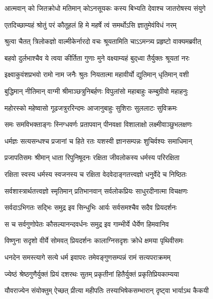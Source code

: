 \twolineshloka
{आत्मवान् को जितक्रोधो मतिमान् कोऽनसूयकः}
{कस्य बिभ्यति देवाश्च जातरोषस्य संयुगे}%

\twolineshloka
{एतदिच्छाम्यहं श्रोतुं परं कौतूहलं हि मे}
{महर्षे त्वं समर्थोऽसि ज्ञातुमेवंविधं नरम्}%

\twolineshloka
{श्रुत्वा चैतत् त्रिलोकज्ञो वाल्मीकेर्नारदो वचः}
{श्रूयतामिति चाऽऽमन्त्र्य प्रहृष्टो वाक्यमब्रवीत्}%

\twolineshloka
{बहवो दुर्लभाश्चैव ये त्वया कीर्तिता गुणाः}
{मुने वक्ष्याम्यहं बुद्‌ध्वा तैर्युक्तः श्रूयतां नरः}%

\twolineshloka
{इक्ष्वाकुवंशप्रभवो रामो नाम जनैः श्रुतः}
{नियतात्मा महावीर्यो द्युतिमान् धृतिमान् वशी}%

\twolineshloka
{बुद्धिमान् नीतिमान् वाग्मी श्रीमाञ्छत्रुनिबर्हणः}
{विपुलांसो महाबाहुः कम्बुग्रीवो महाहनुः}%

\twolineshloka
{महोरस्को महेष्वासो गूढजत्रुररिन्दमः}
{आजानुबाहुः सुशिराः सुललाटः सुविक्रमः}%

\twolineshloka
{समः समविभक्ताङ्गः स्निग्धवर्णः प्रतापवान्}
{पीनवक्षा विशालाक्षो लक्ष्मीवाञ्छुभलक्षणः}%

\twolineshloka
{धर्मज्ञः सत्यसन्धश्च प्रजानां च हिते रतः}
{यशस्वी ज्ञानसम्पन्नः शुचिर्वश्यः समाधिमान्}%

\twolineshloka
{प्रजापतिसमः श्रीमान् धाता रिपुनिषूदनः}
{रक्षिता जीवलोकस्य धर्मस्य परिरक्षिता}%

\twolineshloka
{रक्षिता स्वस्य धर्मस्य स्वजनस्य च रक्षिता}
{वेदवेदाङ्गतत्त्वज्ञो धनुर्वेदे च निष्ठितः}%

\twolineshloka
{सर्वशास्त्रार्थतत्त्वज्ञो स्मृतिमान् प्रतिभानवान्}
{सर्वलोकप्रियः साधुरदीनात्मा विचक्षणः}%

\twolineshloka
{सर्वदाऽभिगतः सद्भिः समुद्र इव सिन्धुभिः}
{आर्यः सर्वसमश्चैव सदैव प्रियदर्शनः}%

\twolineshloka
{स च सर्वगुणोपेतः कौसल्यानन्दवर्धनः}
{समुद्र इव गाम्भीर्ये धैर्येण हिमवानिव}%

\twolineshloka
{विष्णुना सदृशो वीर्ये सोमवत् प्रियदर्शनः}
{कालाग्निसदृशः क्रोधे क्षमया पृथिवीसमः}%

\twolineshloka
{धनदेन समस्त्यागे सत्ये धर्म इवापरः}
{तमेवङ्गुणसम्पन्नं रामं सत्यपराक्रमम्}%

\twolineshloka
{ज्येष्ठं श्रेष्ठगुणैर्युक्तं प्रियं दशरथः सुतम्}
{प्रकृतीनां हितैर्युक्तं प्रकृतिप्रियकाम्यया}%

\twolineshloka
{यौवराज्येन संयोक्तुम् ऐच्छत् प्रीत्या महीपतिः}
{तस्याभिषेकसम्भारान् दृष्ट्वा भार्याऽथ कैकयी}%


